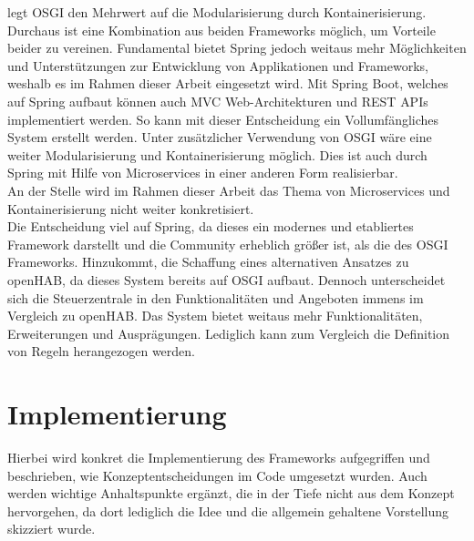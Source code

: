     legt \acs{OSGI} den Mehrwert auf die Modularisierung durch Kontainerisierung. Durchaus ist eine Kombination aus beiden 
    Frameworks möglich, um Vorteile beider zu vereinen. Fundamental bietet Spring jedoch weitaus mehr Möglichkeiten und Unterstützungen 
    zur Entwicklung von Applikationen und Frameworks, weshalb es im Rahmen dieser Arbeit eingesetzt wird. Mit Spring Boot, welches auf Spring 
    aufbaut können auch \acl{MVC} Web-Architekturen und \acs{REST} \acs{API}s implementiert werden. So kann mit dieser Entscheidung 
    ein Vollumfängliches System erstellt werden. Unter zusätzlicher Verwendung von \acs{OSGI} wäre eine weiter Modularisierung und Kontainerisierung möglich. Dies 
    ist auch durch Spring mit Hilfe von Microservices in einer anderen Form realisierbar. 
    \\
    An der Stelle wird im Rahmen dieser Arbeit das Thema von Microservices und Kontainerisierung nicht weiter konkretisiert.
    \\
    \linebreak
    Die Entscheidung viel auf Spring, da dieses ein modernes und etabliertes Framework darstellt und die 
    Community erheblich größer ist, als die des \acs{OSGI} Frameworks. Hinzukommt, die Schaffung eines alternativen Ansatzes zu openHAB, da dieses System bereits 
    auf \acs{OSGI} aufbaut. 
    Dennoch unterscheidet sich die Steuerzentrale in den Funktionalitäten und Angeboten immens im Vergleich zu openHAB. Das System bietet weitaus mehr 
    Funktionalitäten, Erweiterungen und Ausprägungen. Lediglich kann zum Vergleich die Definition von Regeln herangezogen werden. 

\section{Implementierung}
\label{sec:implementation}
    Hierbei wird konkret die Implementierung des Frameworks aufgegriffen und beschrieben, wie Konzeptentscheidungen im Code umgesetzt wurden. 
    Auch werden wichtige Anhaltspunkte ergänzt, die in der Tiefe nicht aus dem Konzept hervorgehen, da dort lediglich die Idee und die allgemein gehaltene 
    Vorstellung skizziert wurde. 

